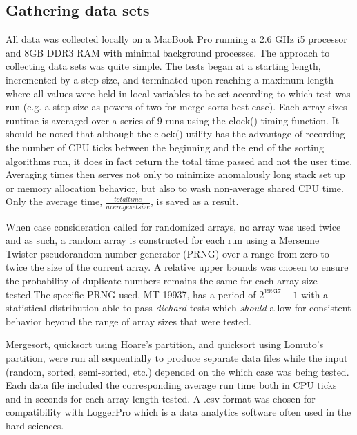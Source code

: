 \documentclass[11pt,letterpaper]{report}
\begin{document}
\subsection*{Gathering data sets}

All data was collected locally on a MacBook Pro running a 2.6 GHz i5 processor and 8GB DDR3 RAM with minimal background processes. The approach to collecting data sets was quite simple. The tests began at a starting length, incremented by a step size, and terminated upon reaching a maximum length where all values were held in local variables to be set according to which test was run (e.g. a step size as powers of two for merge sorts best case). Each array sizes runtime is averaged over a series of 9 runs using the clock() timing function. It should be noted that although the clock() utility has the advantage of recording the number of CPU ticks between the beginning and the end of the sorting algorithms run, it does in fact return the total time passed and not the user time. Averaging times then serves not only to minimize anomalously long stack set up or memory allocation behavior, but also to wash non-average shared CPU time. Only the average time, $\frac{total time}{average set size}$, is saved as a result. 

When case consideration called for randomized arrays, no array was used twice and as such, a random array is constructed for each run using a Mersenne Twister pseudorandom number generator (PRNG) over a range from zero to twice the size of the current array. A relative upper bounds was chosen to ensure the probability of duplicate numbers remains the same for each array size tested.The specific PRNG used, MT-19937, has a period of $2^{19937}-1$ with a statistical distribution able to pass \emph{diehard} tests which \emph{should} allow for consistent behavior beyond the range of array sizes that were tested.

Mergesort, quicksort using Hoare's partition, and quicksort using Lomuto's partition, were run all sequentially to produce separate data files while the input (random, sorted, semi-sorted, etc.) depended on the which case was being tested. Each data file included the corresponding average run time both in CPU ticks and in seconds for each array length tested. A .csv format was chosen for compatibility with LoggerPro which is a data analytics software often used in the hard sciences.
\end{document}
